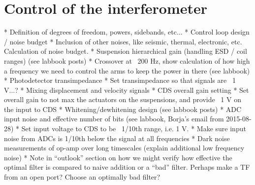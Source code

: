 \chapter{Control of the \SSM{} interferometer}
\label{c:speedmeter-control}


    * Definition of degrees of freedom, powers, sidebands, etc...
    * Control loop design / noise budget
      * Inclusion of other noises, like seismic, thermal, electronic, etc. Calculation of noise budget.
      * Suspension hierarchical gain (handling ESD / coil ranges) (see labbook posts)
        * Crossover at ~200 Hz, show calculation of how high a frequency we need to control the arms to keep the power in there (see labbook)
      * Photodetector transimpedance
        * Set transimpedance so that signals are ~1 V...?
      * Mixing displacement and velocity signals
      * CDS overall gain setting
        * Set overall gain to not max the actuators on the suspensions, and provide ~1 V on the input to CDS
      * Whitening/dewhitening design (see labbook posts)
        * ADC input noise and effective number of bits (see labbook, Borja's email from 2015-08-28)
        * Set input voltage to CDS to be ~1/10th range, i.e. 1 V.
        * Make sure input noise from ADCs is 1/10th below the signal at all frequencies
    * Dark noise measurements of op-amp over long timescales (explain additional low frequency noise)
    * Note in ``outlook'' section on how we might verify how effective the optimal filter is compared to naive addition or a ``bad'' filter. Perhaps make a TF from an open port? Choose an optimally bad filter?